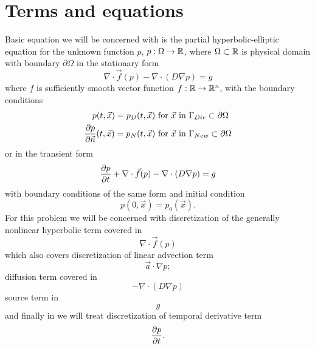 \providecommand{\elint}{\int_{T^k}}
\providecommand{\elbint}{\int_{\partial T^k}}
\section{Terms and equations}
Basic equation we will be concerned with is the partial hyperbolic-elliptic 
equation for the unknown function $p$, $p : \Omega \rightarrow \mathbb{R}$, where 
$\Omega \subset \mathbb{R}$ is physical domain with boundary $\partial\Omega$ in 
the stationary form
\begin{equation}
\label{eq:hyp_diff}
\nabla\cdot \vec{f}(p) -  \nabla \cdot (D \nabla p) = g
\end{equation}
where $f$ is sufficiently smooth vector function $f: \mathbb{R} 
\rightarrow\mathbb{R}^n$, with the boundary conditions
\begin{align}\label{eq:diff_bcs}
p(t, \vec{x}) = p_D(t, \vec{x}) & \text{ for } \vec{x} \text{ in } 
				\Gamma_{Dir} \subset \partial\Omega \\
\frac{\partial p}{\partial\vec{n}}(t, \vec{x}) = p_N(t, \vec{x}) & \text{ for }\vec{x}\text{ in 
} \Gamma_{New} \subset \partial\Omega
\end{align}
or in the transient form
\begin{equation}
	\label{eq:hyp_diff_trans}
	\frac{\partial p}{\partial t} + \nabla\cdot \vec{f}(p) -  \nabla \cdot (D \nabla p) = g
\end{equation}
with boundary conditions of the same form and initial condition
\begin{equation}
	\label{eq:diff_ic}
	p(0, \vec{x}) = p_0(\vec{x}).
\end{equation}
For this problem we will be concerned with discretization of the generally 
nonlinear hyperbolic term covered in 
\begin{equation}
	\nabla\cdot \vec{f}(p)
\end{equation}
which also covers discretization of linear advection term
\begin{equation}
\vec{a} \cdot \nabla p;
\end{equation}
diffusion term covered in 
\begin{equation}
	-  \nabla \cdot (D \nabla p)
\end{equation}
source term in 
\begin{equation}
	g
\end{equation}
and finally in  we will 
treat discretization of temporal derivative term
\begin{equation}
\frac{\partial p}{\partial t}.
\end{equation}


